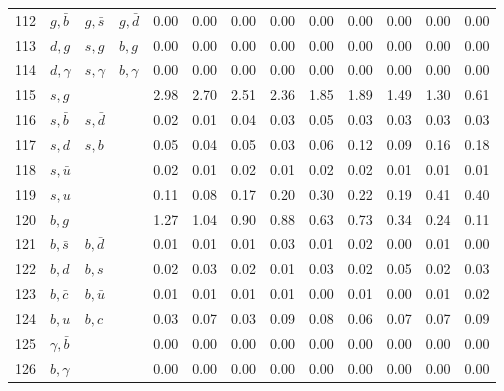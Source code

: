 \begin{tabularx}{\textwidth}{rXXX@{}S@{}S@{}S@{}S@{}S@{}S@{}S@{}S@{}S}
112 & $g, \bar b$      & $g, \bar s$       & $g, \bar d$      &  0.00 &  0.00 &  0.00 &  0.00 &  0.00 &  0.00 &  0.00 &  0.00 &  0.00 \\
113 & $d, g$           & $s,  g$           & $b,  g$          &  0.00 &  0.00 &  0.00 &  0.00 &  0.00 &  0.00 &  0.00 &  0.00 &  0.00 \\
114 & $d, \gamma$      & $s, \gamma$       & $b, \gamma$      &  0.00 &  0.00 &  0.00 &  0.00 &  0.00 &  0.00 &  0.00 &  0.00 &  0.00 \\
115 & $s, g$           &                   &                  &  2.98 &  2.70 &  2.51 &  2.36 &  1.85 &  1.89 &  1.49 &  1.30 &  0.61 \\
116 & $s, \bar b$      & $s, \bar d$       &                  &  0.02 &  0.01 &  0.04 &  0.03 &  0.05 &  0.03 &  0.03 &  0.03 &  0.03 \\
117 & $s, d$           & $s,  b$           &                  &  0.05 &  0.04 &  0.05 &  0.03 &  0.06 &  0.12 &  0.09 &  0.16 &  0.18 \\
118 & $s, \bar u$      &                   &                  &  0.02 &  0.01 &  0.02 &  0.01 &  0.02 &  0.02 &  0.01 &  0.01 &  0.01 \\
119 & $s, u$           &                   &                  &  0.11 &  0.08 &  0.17 &  0.20 &  0.30 &  0.22 &  0.19 &  0.41 &  0.40 \\
120 & $b, g$           &                   &                  &  1.27 &  1.04 &  0.90 &  0.88 &  0.63 &  0.73 &  0.34 &  0.24 &  0.11 \\
121 & $b, \bar s$      & $b, \bar d$       &                  &  0.01 &  0.01 &  0.01 &  0.03 &  0.01 &  0.02 &  0.00 &  0.01 &  0.00 \\
122 & $b, d$           & $b,  s$           &                  &  0.02 &  0.03 &  0.02 &  0.01 &  0.03 &  0.02 &  0.05 &  0.02 &  0.03 \\
123 & $b, \bar c$      & $b, \bar u$       &                  &  0.01 &  0.01 &  0.01 &  0.01 &  0.00 &  0.01 &  0.00 &  0.01 &  0.02 \\
124 & $b, u$           & $b,  c$           &                  &  0.03 &  0.07 &  0.03 &  0.09 &  0.08 &  0.06 &  0.07 &  0.07 &  0.09 \\
125 & $\gamma, \bar b$ &                   &                  &  0.00 &  0.00 &  0.00 &  0.00 &  0.00 &  0.00 &  0.00 &  0.00 &  0.00 \\
126 & $b, \gamma$      &                   &                  &  0.00 &  0.00 &  0.00 &  0.00 &  0.00 &  0.00 &  0.00 &  0.00 &  0.00 \\

\end{tabularx}
